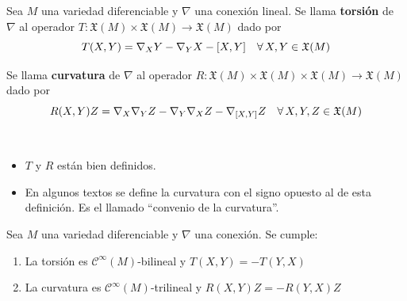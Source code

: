 \begin{defi}
    Sea $M$ una variedad diferenciable y $\nabla$ una conexión lineal. Se llama \textbf{torsión} de $\nabla$ al operador $T: \mathfrak X(M) \times \mathfrak X(M) \to \mathfrak X(M)$ dado por $$T(X,Y) = \nabla_X Y - \nabla_Y X - [X,Y]\quad \forall \, X,Y \in \mathfrak{X}(M)$$
\end{defi}
\begin{defi}
    Se llama \textbf{curvatura} de $\nabla$ al operador $R: \mathfrak X(M) \times \mathfrak X(M) \times \mathfrak X(M) \to \mathfrak X(M)$ dado por $$R(X,Y) Z = \nabla_X \nabla_Y Z - \nabla_Y \nabla_X Z - \nabla_{[X,Y]} Z \quad \forall \, X,Y,Z \in \mathfrak{X}(M)$$
\end{defi}
\begin{obs}\, \vspace{-2mm}\begin{itemize}
    \item $T$ y $R$ est\'an bien definidos. 
    \item En algunos textos se define la curvatura con el signo opuesto al de esta definici\'on. Es el llamado ``convenio de la curvatura''.
    \end{itemize}
\end{obs}
\begin{prop}
    Sea $M$ una variedad diferenciable y $\nabla$ una conexión. Se cumple: \vspace{-2mm}\begin{enumerate}
        \item La torsión es $\mathcal C^{\infty}(M)$-bilineal y $T(X,Y) = -T(Y,X)$
        \item La curvatura es $\mathcal C^{\infty}(M)$-trilineal y $R(X,Y)Z = -R(Y,X)Z$
    \end{enumerate}
\end{prop}
